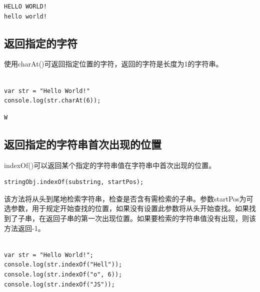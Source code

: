 \begin{tcolorbox}
	\begin{verbatim}
HELLO WORLD!
hello world!
	\end{verbatim}
\end{tcolorbox}

\vspace{0.5cm}

\subsection{返回指定的字符}

使用charAt()可返回指定位置的字符，返回的字符是长度为1的字符串。\\

\\

\begin{lstlisting}[style=htmlcssjs]
var str = "Hello World!"
console.log(str.charAt(6));
\end{lstlisting}

\begin{tcolorbox}
	\begin{verbatim}
W
	\end{verbatim}
\end{tcolorbox}

\vspace{0.5cm}

\subsection{返回指定的字符串首次出现的位置}

indexOf()可以返回某个指定的字符串值在字符串中首次出现的位置。\\

\begin{lstlisting}[style=htmlcssjs]
stringObj.indexOf(substring, startPos);
\end{lstlisting}

该方法将从头到尾地检索字符串，检查是否含有需检索的子串。参数startPos为可选参数，用于规定开始查找的位置，如果没有设置此参数将从头开始查找。如果找到了子串，在返回子串的第一次出现位置。如果要检索的字符串值没有出现，则该方法返回-1。\\

\\

\begin{lstlisting}[style=htmlcssjs]
var str = "Hello World!";
console.log(str.indexOf("Hell"));
console.log(str.indexOf("o", 6));
console.log(str.indexOf("JS"));
\end{lstlisting}

